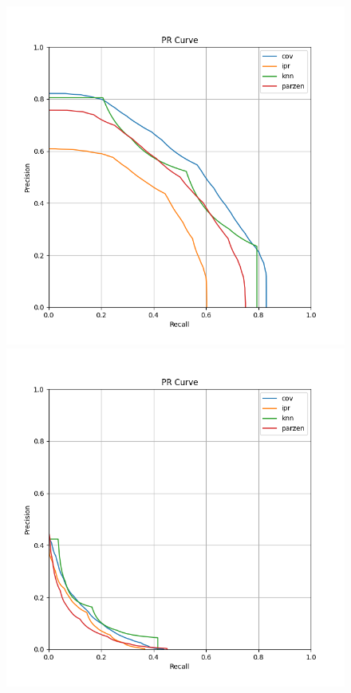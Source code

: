 \begin{figure}[h!]
    \includegraphics[width=\linewidth]{../images/toyexperiments/prcurves/PRCurve_nosplit_k4_s1.png}
    \includegraphics[width=\linewidth]{../images/toyexperiments/prcurves/PRCurve_nosplit_k4_s3.png}

\end{figure}
